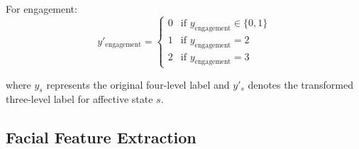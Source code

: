 \documentclass[11pt,a4paper]{article}
\begin{document}
For engagement:
\begin{equation}
  y'_{\text{engagement}} =
  \begin{cases}
    0 & \text{if } y_{\text{engagement}} \in \{0, 1\} \\
    1 & \text{if } y_{\text{engagement}} = 2 \\
    2 & \text{if } y_{\text{engagement}} = 3
  \end{cases}
\end{equation}

where $y_s$ represents the original four-level label and $y'_s$ denotes the transformed three-level label for affective state $s$.

\begin{algorithm}[H]
  \caption{Label Transformation (4-Level $\rightarrow$ 3-Class)}
  \label{alg:label_transform}

  \BlankLine

  \BlankLine

  \BlankLine

  \BlankLine
\end{algorithm}

\subsection{Facial Feature Extraction}
\end{document}

